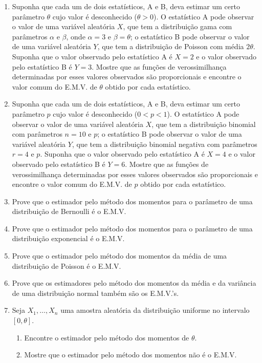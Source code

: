 \begin{enumerate}
    \item Suponha que cada um de dois estatísticos, A e B, deva estimar um certo parâmetro $\theta$ cujo valor é desconhecido ($\theta > 0$). O estatístico A pode observar o valor de uma variável aleatória $X$, que tem a distribuição gama com parâmetros $\alpha$ e $\beta$, onde $\alpha=3$ e $\beta=\theta$; o estatístico B pode observar o valor de uma variável aleatória $Y$, que tem a distribuição de Poisson com média $2\theta$. Suponha que o valor observado pelo estatístico A é $X=2$ e o valor observado pelo estatístico B é $Y=3$. Mostre que as funções de verossimilhança determinadas por esses valores observados são proporcionais e encontre o valor comum do E.M.V. de $\theta$ obtido por cada estatístico.
    
    \item Suponha que cada um de dois estatísticos, A e B, deva estimar um certo parâmetro $p$ cujo valor é desconhecido ($0 < p < 1$). O estatístico A pode observar o valor de uma variável aleatória $X$, que tem a distribuição binomial com parâmetros $n=10$ e $p$; o estatístico B pode observar o valor de uma variável aleatória $Y$, que tem a distribuição binomial negativa com parâmetros $r=4$ e $p$. Suponha que o valor observado pelo estatístico A é $X=4$ e o valor observado pelo estatístico B é $Y=6$. Mostre que as funções de verossimilhança determinadas por esses valores observados são proporcionais e encontre o valor comum do E.M.V. de $p$ obtido por cada estatístico.
    
    \item Prove que o estimador pelo método dos momentos para o parâmetro de uma distribuição de Bernoulli é o E.M.V.
    
    \item Prove que o estimador pelo método dos momentos para o parâmetro de uma distribuição exponencial é o E.M.V.
    
    \item Prove que o estimador pelo método dos momentos da média de uma distribuição de Poisson é o E.M.V.
    
    \item Prove que os estimadores pelo método dos momentos da média e da variância de uma distribuição normal também são os E.M.V.'s.
    
    \item Seja $X_1, \dots, X_n$ uma amostra aleatória da distribuição uniforme no intervalo $[0, \theta]$.
    \begin{enumerate}
        \item Encontre o estimador pelo método dos momentos de $\theta$.
        \item Mostre que o estimador pelo método dos momentos não é o E.M.V.
    \end{enumerate}
    

\end{enumerate}

